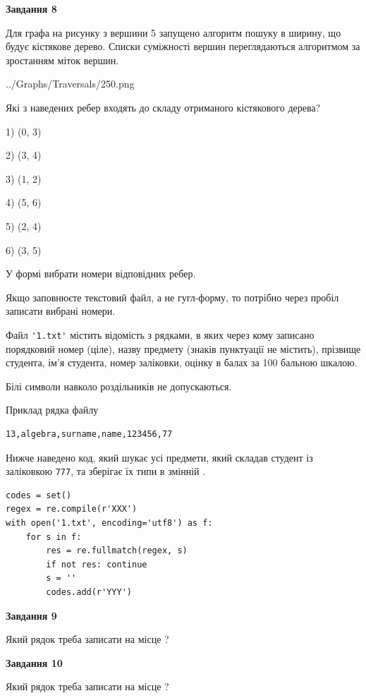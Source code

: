 \documentclass[12pt, ukrainian]{article}
\def\code#1{\Verb!#1!}
\begin{document}
{\begin {large}
{\begin {center}\textbf{Завдання 8}\end {center}}\par
Для графа на рисунку з вершини 5 запущено алгоритм пошуку в ширину, що будує кістякове дерево. Списки суміжності вершин переглядаються алгоритмом за зростанням міток вершин.\par
\begin{center}
	{../Graphs/Traversals/250.png}
\end{center}
\par Які з наведених ребер входять до складу отриманого кістякового дерева?\par
1) (0, 3)\par
2) (3, 4)\par
3) (1, 2)\par
4) (5, 6)\par
5) (2, 4)\par
6) (3, 5)\par
{\vskip 15pt} У формі вибрати номери відповідних ребер.


Якщо заповнюєте текстовий файл, а не гугл-форму, то потрібно через пробіл записа\-ти вибрані номери.\par
\newpage


Файл \code{'1.txt'} містить відомість з рядками, в яких через кому записано поряд\-ковий номер (ціле), назву предмету (знаків пунктуації не містить), прізвище студента, ім'я студента, номер заліковки, оцінку в балах за 100 бальною шкалою.

Білі символи навколо роздільників не допускаються.

Приклад рядка файлу



\begin{verbatim}
13,algebra,surname,name,123456,77
\end{verbatim}


Нижче наведено код, який шукає усі предмети, який складав студент із заліковкою \code{777}, та зберігає їх типи в змінній .



\begin{verbatim}
codes = set()
regex = re.compile(r'XXX')
with open('1.txt', encoding='utf8') as f:
    for s in f:
        res = re.fullmatch(regex, s)
        if not res: continue
        s = ''
        codes.add(r'YYY')
\end{verbatim}


{\begin {center}\textbf{Завдання 9}\end {center}}\par
Який рядок треба записати на місце  ?\par
\vspace{5mm}


{\begin {center}\textbf{Завдання 10}\end {center}}\par
Який рядок треба записати на місце  ?\par


\newpage


\end {large}}
\end{document}
